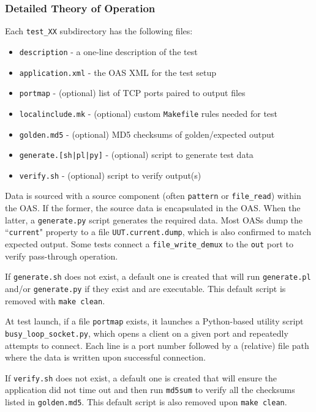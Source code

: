 \documentclass{article}
\begin{document}
\subsubsection*{Detailed Theory of Operation}
\begin{flushleft}
  Each \verb+test_XX+ subdirectory has the following files:

  \begin{itemize}{}{}
    \item \texttt{description} - a one-line description of the test
    \item \texttt{application.xml} - the OAS XML for the test setup
    \item \texttt{portmap} - (optional) list of TCP ports paired to output files
    \item \texttt{localinclude.mk} - (optional) custom \verb+Makefile+ rules needed for test
    \item \texttt{golden.md5} - (optional) MD5 checksums of golden/expected output
    \item \texttt{generate.[sh|pl|py]} - (optional) script to generate test data
    \item \texttt{verify.sh} - (optional) script to verify output(s)
  \end{itemize}

  Data is sourced with a source component (often \verb+pattern+ or \verb+file_read+) within the OAS. If the former, the source data is encapsulated in the OAS. When the latter, a \verb+generate.py+ script generates the required data. Most OASs dump the ``\texttt{current}" property to a file \verb+UUT.current.dump+, which is also confirmed to match expected output. Some tests connect a \verb+file_write_demux+ to the \verb+out+ port to verify pass-through operation.
  \medskip

  If \texttt{generate.sh} does not exist, a default one is created that will run \texttt{generate.pl} and/or \texttt{generate.py} if they exist and are executable. This default script is removed with \verb+make clean+.
  \medskip

  At test launch, if a file \texttt{portmap} exists, it launches a Python-based utility script \verb+busy_loop_socket.py+, which opens a client on a given port and repeatedly attempts to connect. Each line is a port number followed by a (relative) file path where the data is written upon successful connection.
  \medskip

  If \texttt{verify.sh} does not exist, a default one is created that will ensure the application did not time out and then run \texttt{md5sum} to verify all the checksums listed in \texttt{golden.md5}. This default script is also removed upon \verb+make clean+.
\end{flushleft}
\end{document}
